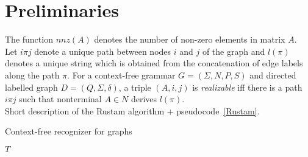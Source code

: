 \section{Preliminaries}
The function $nnz(A)$ denotes the number of non-zero elements in matrix $A$.
\\
Let $i\pi j$ denote a unique path between nodes $i$ and $j$ of the graph and $l(\pi)$ denotes a unique string which is obtained from the concatenation of edge labels along the path $\pi$.
For a context-free grammar $G = (\Sigma, N, P, S)$ and directed labelled graph $D = (Q, \Sigma, \delta)$, a triple $(A, i, j)$ is \textit{realizable} iff there is a path $i\pi j$ such that nonterminal $A \in N$ derives $l(\pi)$.
\\
Short description of the Rustam algorithm + pseudocode~\ref{Rustam}. 
\begin{algorithm}[H]
\begin{algorithmic}[1]
\caption{Context-free recognizer for graphs}
\label{alg:Azimov}
    
    \EndFor    
       
    \EndWhile
\State \Return $T$
\EndFunction
\end{algorithmic}
\end{algorithm}
